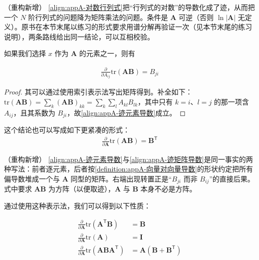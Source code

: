 \documentclass[../main.tex]{subfiles}
\begin{document}
\begin{remark}（重构新增）
\eqref{align:appA-对数行列式}把“行列式的对数”的导数化成了迹，从而把一个 $N$ 阶行列式的问题降为矩阵乘法的问题。条件是 $\bm{A}$ 可逆（否则 $\ln|\bm{A}|$ 无定义）。原书在本节末尾以练习的形式要求用谱分解再验证一次（见本节末尾的练习说明），两条路线给出同一结论，可以互相校验。
\end{remark}

如果我们选择 $x$ 作为 $\bm{A}$ 的元素之一，则有
\begin{proposition}[迹关于矩阵元素的导数]\label{proposition:appA-迹的矩阵导数}
\begin{align}
  \frac{\partial}{\partial A_{ij}}\mathrm{tr}(\bm{A}\bm{B})=B_{ji}
  \label{align:appA-迹元素导数}
\end{align}
\end{proposition}

\begin{proof}
其可以通过使用索引表示法写出矩阵得到。补全如下：$\mathrm{tr}(\bm{A}\bm{B})=\sum_k(\bm{A}\bm{B})_{kk}=\sum_k\sum_l A_{kl}B_{lk}$，其中只有 $k=i$、$l=j$ 的那一项含 $A_{ij}$，且其系数为 $B_{ji}$，故\eqref{align:appA-迹元素导数}成立。
\end{proof}

这个结论也可以写成如下更紧凑的形式：
\begin{align}
  \frac{\partial}{\partial\bm{A}}\mathrm{tr}(\bm{A}\bm{B})=\bm{B}^{\mathsf{T}}
  \label{align:appA-迹矩阵导数}
\end{align}

\begin{remark}（重构新增）
\eqref{align:appA-迹元素导数}与\eqref{align:appA-迹矩阵导数}是同一事实的两种写法：前者逐元素，后者按\cref{definition:appA-向量对向量导数}的形状约定把所有偏导数堆成一个与 $\bm{A}$ 同型的矩阵。右端出现转置正是“$B_{ji}$ 而非 $B_{ij}$”的直接后果。式中要求 $\bm{A}\bm{B}$ 为方阵（以便取迹），$\bm{A}$ 与 $\bm{B}$ 本身不必是方阵。
\end{remark}

通过使用这种表示法，我们可以得到以下性质：
\begin{proposition}[矩阵导数的若干恒等式]\label{proposition:appA-矩阵导数恒等式}
\begin{align}
  \frac{\partial}{\partial\bm{A}}\mathrm{tr}(\bm{A}^{\mathsf{T}}\bm{B})&=\bm{B}
  \label{align:appA-矩阵导数性质1}\\
  \frac{\partial}{\partial\bm{A}}\mathrm{tr}(\bm{A})&=\bm{I}
  \label{align:appA-矩阵导数性质2}\\
  \frac{\partial}{\partial\bm{A}}\mathrm{tr}(\bm{A}\bm{B}\bm{A}^{\mathsf{T}})&=\bm{A}(\bm{B}+\bm{B}^{\mathsf{T}})
  \label{align:appA-矩阵导数性质3}
\end{align}
\end{proposition}
\end{document}
